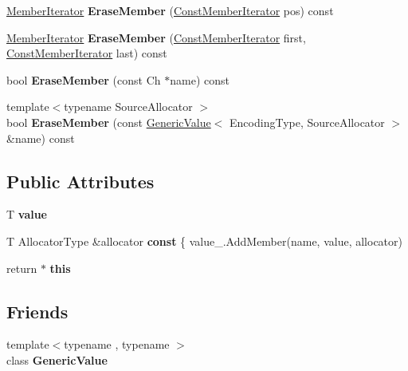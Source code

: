 \begin{DoxyCompactItemize}
\hyperlink{classGenericMemberIterator}{Member\+Iterator} {\bfseries Erase\+Member} (\hyperlink{classGenericMemberIterator}{Const\+Member\+Iterator} pos) const
\item 
\mbox{\label{classGenericObject_a67f85d2da462287dead8e35f2ac974b5}} 
\hyperlink{classGenericMemberIterator}{Member\+Iterator} {\bfseries Erase\+Member} (\hyperlink{classGenericMemberIterator}{Const\+Member\+Iterator} first, \hyperlink{classGenericMemberIterator}{Const\+Member\+Iterator} last) const
\item 
\mbox{\label{classGenericObject_af0d31a8547051624449494a339b20107}} 
bool {\bfseries Erase\+Member} (const Ch $\ast$name) const
\item 
\mbox{\label{classGenericObject_a4cd6f90444f20cc9d5577747d3968da4}} 
{\footnotesize template$<$typename Source\+Allocator $>$ }\\bool {\bfseries Erase\+Member} (const \hyperlink{classGenericValue}{Generic\+Value}$<$ Encoding\+Type, Source\+Allocator $>$ \&name) const
\end{DoxyCompactItemize}
\subsection*{Public Attributes}
\begin{DoxyCompactItemize}
\item 
\mbox{\label{classGenericObject_a131538fbbacbc0a3a5ad15dbea66394f}} 
T {\bfseries value}
\item 
\mbox{\label{classGenericObject_af70c9646b5e422306c33e98b3d8783a7}} 
T Allocator\+Type \&allocator {\bfseries const} \{ value\+\_\+.\+Add\+Member(name, value, allocator)
\item 
\mbox{\label{classGenericObject_a719a0e5501da825e6f86ce12b46446cb}} 
return $\ast$ {\bfseries this}
\end{DoxyCompactItemize}
\subsection*{Friends}
\begin{DoxyCompactItemize}
\item 
\mbox{\label{classGenericObject_a899449e1a645b5e377af059fb61113d8}} 
{\footnotesize template$<$typename , typename $>$ }\\class {\bfseries Generic\+Value}
\end{DoxyCompactItemize}


